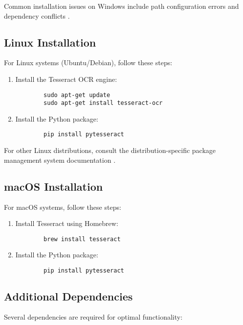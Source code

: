 Common installation issues on Windows include path configuration errors and dependency conflicts \cite{Reddit:2023}.

\subsection{Linux Installation}
\label{subsec:linux_install}

For Linux systems (Ubuntu/Debian), follow these steps:

\begin{enumerate}
	\item Install the Tesseract OCR engine:
	\begin{verbatim}
		sudo apt-get update
		sudo apt-get install tesseract-ocr
	\end{verbatim}
	\item Install the Python package:
	\begin{verbatim}
		pip install pytesseract
	\end{verbatim}
\end{enumerate}

For other Linux distributions, consult the distribution-specific package management system documentation \cite{Tesseract:2021}.

\subsection{macOS Installation}
\label{subsec:macos_install}

For macOS systems, follow these steps:

\begin{enumerate}
	\item Install Tesseract using Homebrew:
	\begin{verbatim}
		brew install tesseract
	\end{verbatim}
	\item Install the Python package:
	\begin{verbatim}
		pip install pytesseract
	\end{verbatim}
\end{enumerate}

\subsection{Additional Dependencies}
\label{subsec:dependencies}

Several dependencies are required for optimal functionality:

